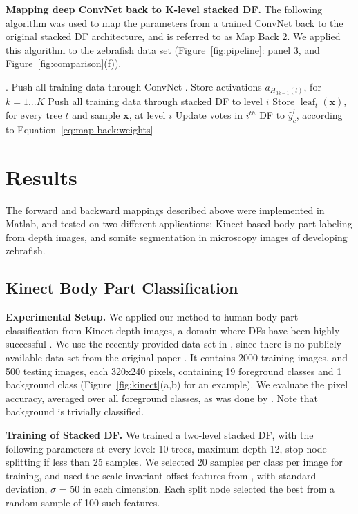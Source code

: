 \documentclass[twocolumn]{svjour3}
\DeclareMathOperator{\leaf}{leaf}
\begin{document}
\begin{algorithm}
\caption{\textbf{Mapping deep ConvNet back to K-level stacked DF.} The following algorithm was used to map the parameters from a trained ConvNet back to the original stacked DF architecture, and is referred to as Map Back 2.
We applied this algorithm to the zebrafish data set (Figure~\ref{fig:pipeline}: panel 3, and Figure~\ref{fig:comparison}(f)).}
\begin{algorithmic}
. Push all training data through ConvNet
. Store activations $a_{H_{3k-1}(l)}$, for $k = 1...K$
        \State Push all training data through stacked DF to level $i$
        \State Store $\leaf_t(\mathbf{x})$, for every tree $t$ and sample $\mathbf{x}$, at level $i$
        \State Update votes in $i^{th}$ DF to $\hat{y}^l_c$, according to Equation~\ref{eq:map-back:weights}
      \EndFor
\end{algorithmic}
\label{alg:reweighting}
\end{algorithm}

\section{Results}

The forward and backward mappings described above were implemented in Matlab, and tested on two different applications: Kinect-based body part labeling from depth images, and somite segmentation in microscopy images of developing zebrafish.

\subsection{Kinect Body Part Classification}

%
\textbf{Experimental Setup. }
%
We applied our method to human body part classification from Kinect depth images, a domain where DFs have been highly successful \cite{shotton}.
We use the recently provided data set in \cite{denil}, since there is no publicly available data set from the original paper \cite{shotton}.
It contains 2000 training images, and 500 testing images, each 320x240 pixels, containing 19 foreground classes and 1 background class (Figure~\ref{fig:kinect}(a,b) for an example).
We evaluate the pixel accuracy, averaged over all foreground classes, as was done by \cite{denil}.
Note that background is trivially classified.

%
\textbf{Training of Stacked DF. }
%
We trained a two-level stacked DF, with the following parameters at every level: 10 trees, maximum depth 12, stop node splitting if less than 25 samples.
We selected 20 samples per class per image for training, and used the scale invariant offset features from \cite{shotton}, with standard deviation, $\sigma$ = 50 in each dimension.
Each split node selected the best from a random sample of 100 such features.
\end{document}
